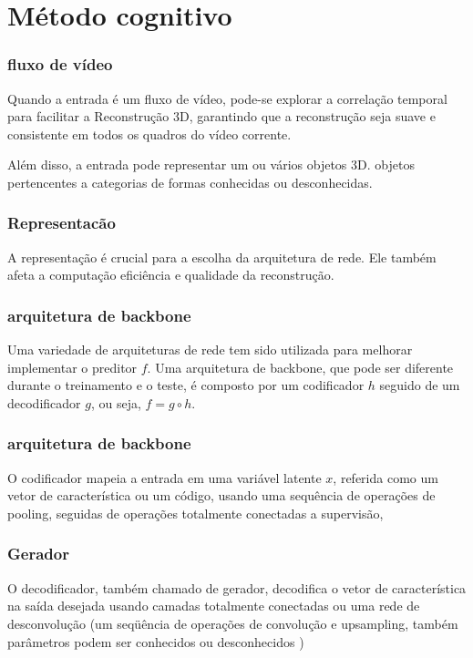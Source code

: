 \section{Método cognitivo}

\begin{frame}
\frametitle{fluxo de vídeo}

Quando a entrada é um fluxo de vídeo, pode-se explorar a correlação temporal
    para facilitar a Reconstrução 3D, garantindo que a reconstrução seja suave
    e consistente em todos os quadros do vídeo corrente.

Além disso, a entrada pode representar um ou vários objetos 3D.  objetos
    pertencentes a categorias de formas conhecidas ou desconhecidas.
\end{frame}


\begin{frame}
\frametitle{Representacão}

A representação é crucial para a escolha da
arquitetura de rede. Ele também afeta a computação
eficiência e qualidade da reconstrução.

\end{frame}

\begin{frame}
\frametitle{arquitetura de backbone}

Uma variedade de arquiteturas de rede tem sido utilizada para melhorar
    implementar o preditor $f$. Uma arquitetura de backbone, que pode ser
    diferente durante o treinamento e o teste, é composto por um codificador
    $h$ seguido de um decodificador $g$, ou seja, $f=g \circ h$.

\end{frame}

\begin{frame}
\frametitle{arquitetura de backbone}

O codificador mapeia a entrada em uma variável latente $x$, referida como
    um vetor de característica ou um código, usando uma sequência de operações
    de pooling, seguidas de operações totalmente conectadas a supervisão,

\end{frame}

\begin{frame}
\frametitle{Gerador}

O decodificador, também chamado de gerador, decodifica o vetor de
    característica na saída desejada usando camadas totalmente conectadas ou
    uma rede de desconvolução (um seqüência de operações de convolução e
    upsampling, também parâmetros podem ser conhecidos ou desconhecidos )

\end{frame}
